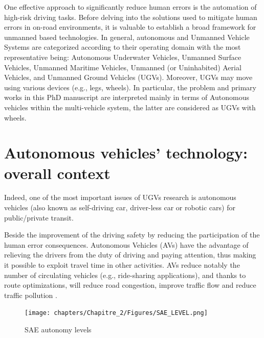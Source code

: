 One effective approach to significantly reduce human errors is the automation of high-risk driving tasks. Before delving into the solutions used to mitigate human errors in on-road environments, it is valuable to establish a broad framework for unmanned based technologies. In general, autonomous and Unmanned Vehicle Systems \cite{adouane2016autonomous} are categorized according to their operating domain with the most representative being: 
Autonomous Underwater Vehicles, Unmanned Surface Vehicles, Unmanned Maritime Vehicles, Unmanned (or Uninhabited) Aerial Vehicles, and Unmanned Ground Vehicles (UGVs). Moreover, UGVs may move using various devices (e.g., legs, wheels). In particular, the problem and primary works in this PhD manuscript are interpreted mainly in terms of Autonomous vehicles within the multi-vehicle system, the latter are considered as UGVs with wheels. 






\section{Autonomous vehicles' technology: overall context}

 Indeed, one of the most important issues of UGVs research is autonomous vehicles (also known as  self-driving car, driver-less car or robotic cars) for public/private transit. 
 
 Beside the improvement of the driving safety by reducing the participation of the human error consequences. Autonomous Vehicles (AVs) have the advantage of relieving the drivers from the duty of driving and paying attention, thus making it possible to exploit travel time in other activities. AVs reduce notably the number of circulating vehicles (e.g., ride-sharing applications), and thanks to route optimizations, will reduce road congestion, improve traffic flow and reduce traffic pollution \cite{mariani2021coordination}. 
 

\begin{figure}[!b]
        \centering 
        \texttt{[image: chapters/Chapitre\_2/Figures/SAE\_LEVEL.png]}
        \caption{SAE autonomy levels \cite{sae2018taxonomy}}
        \label{fig:SAE_Levels}
        \end{figure} 

